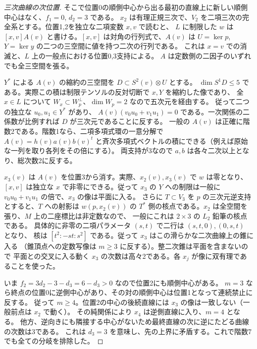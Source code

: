 \begin{proof}[三次曲線の次位置]
そこで位置0の順側中心から出る最初の直線上に新しい順側中心はなく、$f_1=0$, $d_2=3$ である。
$x_2$ は有理正規三次で、$V_2$ を二項三次の完全系とする。位置1,2を独立な二項変数 $x,v$ で読むと、
$L$ に制限した $w$ は $[x,v]A(v)$ と書ける。$[x,v]$ は対角の行列式で、$A(v)$ は
$U=\ker p$, $Y=\ker y$ の二つの三空間に値を持つ二次の行列である。
これは $x=v$ での消滅と、$L$ 上の一般点における位置0,3支持による。
$A$ は定数側の二因子のいずれでも全三空間を張る。

$Y^*$ による $A(v)$ の縮約の三空間を $D\subset S^2(v)\otimes U$ とする。
$\dim S^1 D\le5$ である。実際この積は制限テンソルの反対切断で $x,Y$ を縮約した像であり、
全 $x\in L$ について $W_x\subset W_p^\perp$、$\dim W_p=2$ なので五次元を経由する。
従って二つの独立な $u_0,u_1\in Y^*$ があり、
$A(v)(v_0u_0+v_1u_1)=0$ である。一次関係の二係数が比例すれば $D$ が三次元であることに反する。
一般の $A(v)$ は正確に階数2である。階数1なら、二項多項式環の一意分解で
$A(v)=h(v)a(v)b(v)^t$ と斉次多項式ベクトルの積にできる（例えば原始な一列を取り各列をその倍にする）。
両支持が3なので $a,b$ は各々二次以上となり、総次数2に反する。

$x_3(v)$ は $A(v)$ を位置3から消す。実際、$x_2(v),x_3(v)$ で $w$ は零となり、
$[x,v]$ は独立な $x$ で非零にできる。従って $x_3$ の $Y$ への制限は一般に
$v_0u_0+v_1u_1$ の倍で、$x_3$ の像は平面に入る。
さらに $T\subset V_3$ を $p$ の三次元逆支持とすると、$T$ への射影は
$w(p,x_2(v))$ の $T^*$ 側の核点である。$x_2$ は全空間を張り、$M$ 上の二座標比は非定数なので、
一般にこれは $2\times3$ の $L_2$ 鉛筆の核点である。
具体的に非零の二項パラメータ $(s,t)$ で二行は $(s,t,0),(0,s,t)$ となり、
核は $[t^2:-st:s^2]$ である。従って $x_3$ はこの滑らかな二次曲線上の錐に入る
（錐頂点への定数写像は $m\ge3$ に反する）。整二次錐は平面を含まないので
平面との交叉に入る動く $x_3$ の次数は高々2である。各 $x_j$ が像に双有理であることを使った。

いま $f_2=3d_2-3-d_3=6-d_3>0$ なので位置2にも順側中心がある。
$m=3$ なら終点の位置0に逆側中心があり、その対の順側中心は位置1となって連続禁止に反する。
従って $m\ge4$。位置2の中心の後続直線には $x_3$ の像は一致しない（一般前点は $x_2$ で動く）。
その純関係により $x_4$ は逆側直線に入り、$m=4$ となる。
他方、逆向きにも隣接する中心がないため最終直線の次に逆にたどる曲線の次数は3である。
これは $d_3=3$ を意味し、先の上界に矛盾する。これで階数7でも全ての分岐を排除した。
\end{proof}

